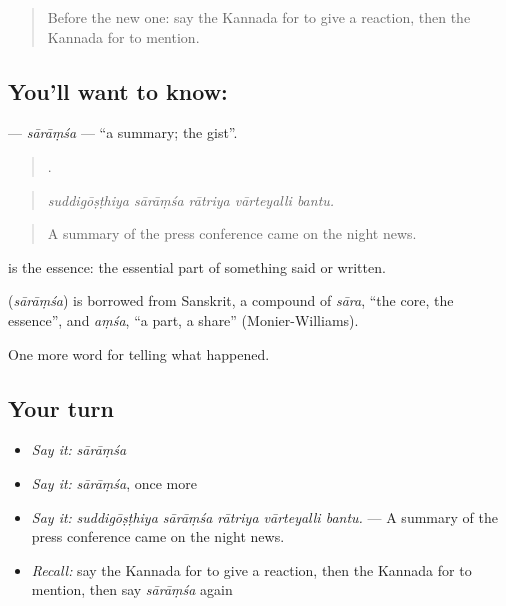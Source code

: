 \label{lesson:KA-C347-saramsa}



\begin{quote}
Before the new one: say the Kannada for to give a reaction, then the Kannada for to mention.
\end{quote}

\subsection*{You'll want to know: }
\textbf{} — \emph{sārāṃśa} — \textquotedblleft{}a summary; the gist\textquotedblright{}.

\begin{quote}
    .
\end{quote}

\begin{quote}
\emph{suddigōṣṭhiya sārāṃśa rātriya vārteyalli bantu.}
\end{quote}

\begin{quote}
A summary of the press conference came on the night news.
\end{quote}

 is the essence: the essential part of something said or written.

\begin{cousinweb}
\textbf{} (\emph{sārāṃśa}) is borrowed from Sanskrit, a compound of \emph{sāra}, \textquotedblleft{}the core, the essence\textquotedblright{}, and \emph{aṃśa}, \textquotedblleft{}a part, a share\textquotedblright{} (Monier-Williams).
\end{cousinweb}

\begin{grammarlens}[title={What you've built}]
One more word for telling what happened.
\end{grammarlens}

\subsection*{Your turn}
\begin{itemize}
\raggedright
  \item \emph{Say it:} \emph{sārāṃśa}
  \item \emph{Say it:} \emph{sārāṃśa}, once more
  \item \emph{Say it:} \emph{suddigōṣṭhiya sārāṃśa rātriya vārteyalli bantu.} — A summary of the press conference came on the night news.
  \item \emph{Recall:} say the Kannada for to give a reaction, then the Kannada for to mention, then say \emph{sārāṃśa} again
\end{itemize}

